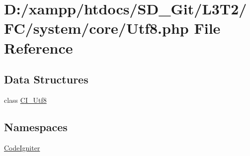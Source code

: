 \hypertarget{system_2core_2_utf8_8php}{}\section{D\+:/xampp/htdocs/\+S\+D\+\_\+\+Git/\+L3\+T2/\+F\+C/system/core/\+Utf8.php File Reference}
\label{system_2core_2_utf8_8php}
\subsection*{Data Structures}
\begin{DoxyCompactItemize}
\item 
class \hyperlink{class_c_i___utf8}{C\+I\+\_\+\+Utf8}
\end{DoxyCompactItemize}
\subsection*{Namespaces}
\begin{DoxyCompactItemize}
\item 
 \hyperlink{namespace_code_igniter}{Code\+Igniter}
\end{DoxyCompactItemize}
